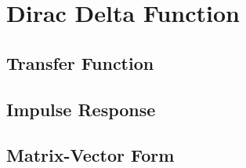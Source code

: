 \section*{Dirac Delta Function}
\subsection*{Transfer Function}
\subsection*{Impulse Response}
\subsection*{Matrix-Vector Form}